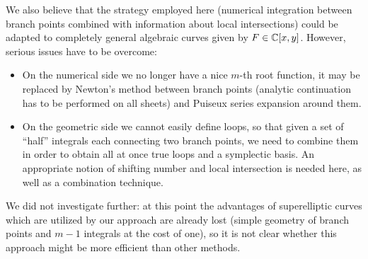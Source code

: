\documentclass[main.tex]{subfiles}
\begin{document}
  \medskip
  
  We also believe that the strategy employed here (numerical integration between
  branch points combined with information about local intersections) could
  be adapted to completely general algebraic curves given by $F \in \mathbb{C}[x,y]$.
  However, serious issues have to be overcome:
  \begin{itemize}
      \item On the numerical side we no longer have a nice $m$-th root function, it may be replaced by
          Newton's method between branch points (analytic continuation has to be performed on all sheets) and
          Puiseux series expansion around them.
      \item On the geometric side we cannot easily define loops, so that given a set
          of ``half'' integrals each connecting two branch points, we need to combine them in order
          to obtain all at once true loops and a symplectic basis.
          An appropriate notion of shifting number and local intersection is needed here,
          as well as a combination technique.
  \end{itemize}
  We did not investigate further: at this point the advantages
  of superelliptic curves which are utilized by our approach are already lost
 (simple geometry of branch points and $m-1$ integrals at the cost of one), 
  so it is
  not clear whether this approach might be more efficient than other methods.

  \biblio
  
\end{document}
